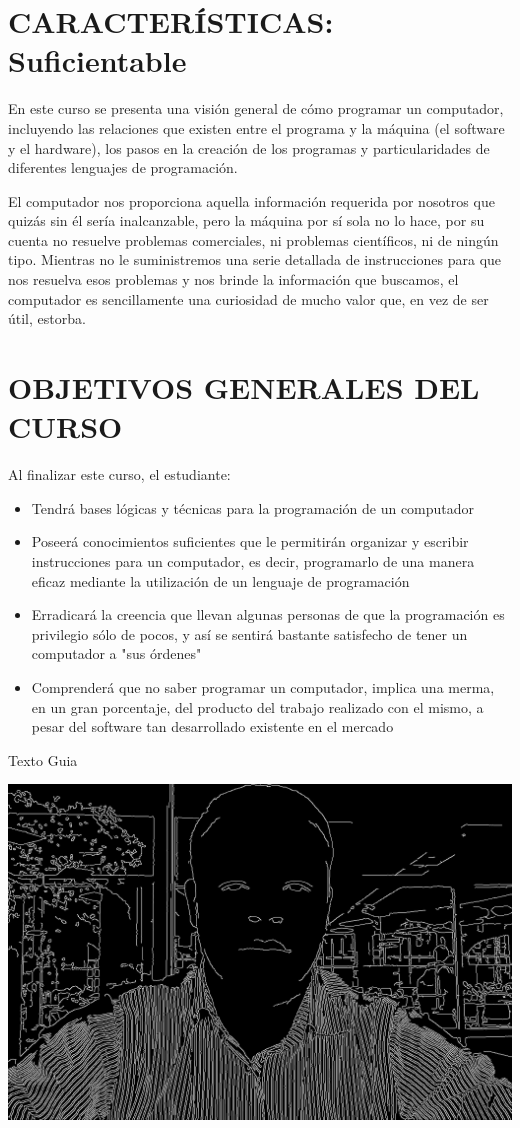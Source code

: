 

\section{CARACTERÍSTICAS: Suficientable}

En este curso se presenta una visión general de cómo programar un computador, incluyendo las relaciones que existen entre el programa y la máquina (el software y el hardware), los pasos en la creación de los programas y particularidades de diferentes lenguajes de programación.

El computador nos proporciona aquella información requerida por nosotros que quizás sin él sería inalcanzable, pero la máquina por sí sola no lo hace, por su cuenta no resuelve problemas comerciales, ni problemas científicos, ni de ningún tipo. Mientras no le suministremos una serie detallada de instrucciones para que nos resuelva esos problemas y nos brinde la información que buscamos, el computador es sencillamente una curiosidad de mucho valor que, en vez de ser útil, estorba.

\section{OBJETIVOS GENERALES DEL CURSO}

Al finalizar este curso, el estudiante:

\begin{itemize}
	\item Tendrá bases lógicas y técnicas para la programación de un computador 

	\item Poseerá conocimientos suficientes que le permitirán organizar y escribir instrucciones para un computador, es decir, programarlo de una manera eficaz mediante la utilización de un lenguaje de programación

	\item Erradicará la creencia que llevan algunas personas de que la programación es privilegio sólo de pocos, y así se sentirá bastante satisfecho de tener un computador a "sus órdenes"

	\item Comprenderá que no saber programar un computador, implica una merma, en un gran porcentaje, del producto del trabajo realizado con el mismo, a pesar del software tan desarrollado existente en el mercado
\end{itemize}

Texto Guia \cite{farrell2011programming}

\includegraphics[width=15cm]{SamCanny.jpg}

